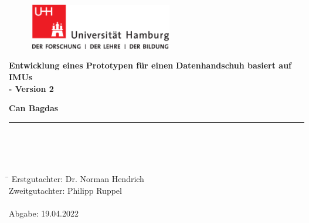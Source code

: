 \begin{titlepage}

  \setcounter{page}{-1}

	\begin{figure}[h]
		\begin{minipage}[b]{62mm}
			\includegraphics[width=62mm]{images/unilogo}
		\end{minipage}
		\hspace{4cm}
	\end{figure}

	\vfill
	
	\begin{center}
		\vspace{14mm}
		\noindent \textbf{\huge
		  Entwicklung eines Prototypen für einen 
		}
		\noindent \textbf{\huge
		  Datenhandschuh basiert auf IMUs 
		}
		\\
		\noindent \textbf{\huge
		  - Version 2
		}
		\vspace{60mm}	
	\end{center}
	
	\vfill
	
	\noindent \textbf{Can Bagdas} \\
	\noindent \rule{\textwidth}{0.4mm} 
	 \\
	 \\
	 \\
	\begin{tabbing}
	\hspace{8em} \=  \kill
	Erstgutachter: \> Dr. Norman Hendrich \\
	Zweitgutachter: \> Philipp Ruppel \\
	~ \\
	Abgabe: 19.04.2022
	\end{tabbing}
	
	\newpage 
	\thispagestyle{empty}
	\setcounter{page}{0}

	~\\ \vfill \noindent 
\end{titlepage}

